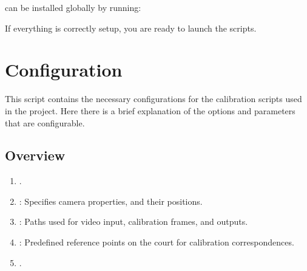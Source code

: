 \documentclass[letterpaper,10pt,english]{sphinxmanual}
\begin{document}
\sphinxAtStartPar
{} can be installed globally by running:

\begin{sphinxVerbatim}[commandchars=\\\{\}]
   
\end{sphinxVerbatim}

\sphinxAtStartPar
If everything is correctly setup, you are ready to launch the scripts.

\sphinxstepscope


\chapter{Configuration}
\label{\detokenize{conf:configuration}}\label{\detokenize{conf::doc}}
\sphinxAtStartPar
This script contains the necessary configurations for the calibration scripts used in the project.
Here there is a brief explanation of the options and parameters that are configurable.


\section{Overview}
\label{\detokenize{conf:overview}}\begin{enumerate}
%
\item {} 
\sphinxAtStartPar
{}.

\item {} 
\sphinxAtStartPar
{}: Specifies camera properties, and their positions.

\item {} 
\sphinxAtStartPar
{}: Paths used for video input, calibration frames, and outputs.

\item {} 
\sphinxAtStartPar
{}: Predefined reference points on the court for calibration correspondences.

\item {} 
\sphinxAtStartPar
{}.

\end{enumerate}
\end{document}
